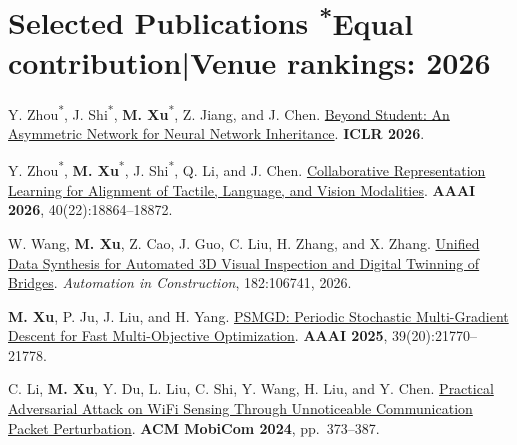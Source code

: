 \section[Selected Publications]{\color{accentcolor}Selected Publications\hfill
  {\normalfont\small\color{darkGrey}\textsuperscript{*}Equal contribution\enspace|\enspace Venue rankings: 2026}}
\begin{enumerate}[label={[\arabic*]}, leftmargin=1.8em, topsep=2pt, itemsep=2pt, parsep=0pt, before=\raggedright]
  \item Y. Zhou\textsuperscript{*}, J. Shi\textsuperscript{*}, \textbf{M. Xu}\textsuperscript{*}, Z. Jiang, and J. Chen.
    \href{https://proceedings.iclr.cc/paper_files/paper/2026/file/661c37f3b098bdee53fd7d9c4ef6964a-Paper-Conference.pdf}{Beyond Student: An Asymmetric Network for Neural Network Inheritance}.
    \textcolor{accentcolor}{\textbf{ICLR 2026}}.
  \item Y. Zhou\textsuperscript{*}, \textbf{M. Xu}\textsuperscript{*}, J. Shi\textsuperscript{*}, Q. Li, and J. Chen.
    \href{https://doi.org/10.1609/aaai.v40i22.38956}{Collaborative Representation Learning for Alignment of Tactile, Language, and Vision Modalities}.
    \textcolor{accentcolor}{\textbf{AAAI 2026}}, 40(22):18864--18872.
  \item W. Wang, \textbf{M. Xu}, Z. Cao, J. Guo, C. Liu, H. Zhang, and X. Zhang.
    \href{https://www.sciencedirect.com/science/article/pii/S0926580525007812}{Unified Data Synthesis for Automated 3D Visual Inspection and Digital Twinning of Bridges}.
    \textcolor{accentcolor}{\textit{Automation in Construction}}, 182:106741, 2026.
  \item \textbf{M. Xu}, P. Ju, J. Liu, and H. Yang.
    \href{https://doi.org/10.1609/aaai.v39i20.35482}{PSMGD: Periodic Stochastic Multi-Gradient Descent for Fast Multi-Objective Optimization}.
    \textcolor{accentcolor}{\textbf{AAAI 2025}}, 39(20):21770--21778.
  \item C. Li, \textbf{M. Xu}, Y. Du, L. Liu, C. Shi, Y. Wang, H. Liu, and Y. Chen.
    \href{https://doi.org/10.1145/3636534.3649367}{Practical Adversarial Attack on WiFi Sensing Through Unnoticeable Communication Packet Perturbation}.
    \textcolor{accentcolor}{\textbf{ACM MobiCom 2024}}, pp.\ 373--387.
\end{enumerate}
